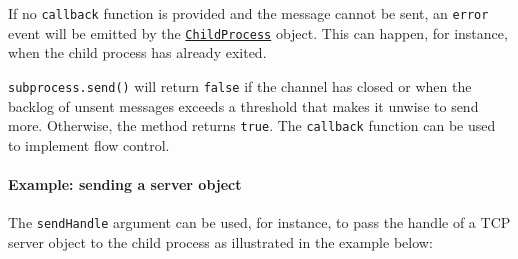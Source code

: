 If no \texttt{callback} function is provided and the message cannot be
sent, an \texttt{\textquotesingle{}error\textquotesingle{}} event will
be emitted by the \hyperref[class-childprocess]{\texttt{ChildProcess}}
object. This can happen, for instance, when the child process has
already exited.

\texttt{subprocess.send()} will return \texttt{false} if the channel has
closed or when the backlog of unsent messages exceeds a threshold that
makes it unwise to send more. Otherwise, the method returns
\texttt{true}. The \texttt{callback} function can be used to implement
flow control.

\paragraph{Example: sending a server
object}\label{example-sending-a-server-object}

The \texttt{sendHandle} argument can be used, for instance, to pass the
handle of a TCP server object to the child process as illustrated in the
example below:

\begin{Shaded}
\begin{Highlighting}[]
\OperatorTok{=} \NormalTok{(}\NormalTok{)}\NormalTok{(}\NormalTok{)}\OperatorTok{;}

\OperatorTok{=} \NormalTok{(}\NormalTok{)}\NormalTok{()}\OperatorTok{;}
\NormalTok{(}\OperatorTok{,}\KeywordTok{=\textgreater{}}\NormalTok{ \{}
\NormalTok{(}\NormalTok{)}\OperatorTok{;}
\NormalTok{\})}\OperatorTok{;}
\NormalTok{(}\OperatorTok{,}\NormalTok{ () }\KeywordTok{=\textgreater{}}\NormalTok{ \{}
\NormalTok{(}\OperatorTok{,}\OperatorTok{;}
\NormalTok{\})}\OperatorTok{;}
\end{Highlighting}
\end{Shaded}


